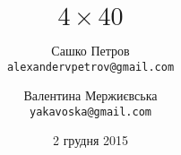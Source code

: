 \documentclass[a4paper,12pt]{book}
\begin{document}
\author{
    Сашко Петров\\
    \texttt{alexandervpetrov@gmail.com}
    \and
    Валентина Мержиєвська\\
    \texttt{yakavoska@gmail.com}
}
\title{\Huge $4 \times 40$}
\date{2 грудня 2015}

\frontmatter
\maketitle
\tableofcontents
\mainmatter





\backmatter
\end{document}
